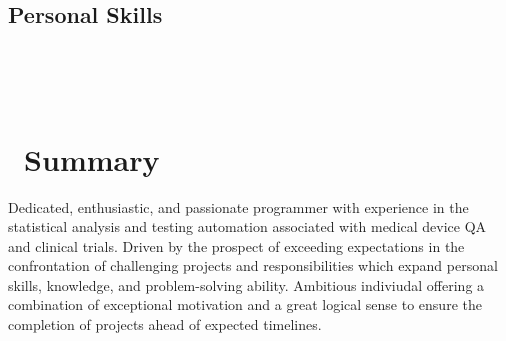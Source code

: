 \documentclass[]{moak-resume}
\begin{document}
\begin{aside}
  \section{Personal Skills}
    ~
\end{aside}
~
\section{ \newline Summary}
\begin{entrylist}
	\entry
	{}
	{}
	{}
	{Dedicated, enthusiastic, and passionate programmer with experience in the statistical analysis and testing automation associated with medical device QA and clinical trials.  Driven by the prospect of exceeding expectations in the confrontation of challenging projects and responsibilities which expand personal skills, knowledge, and problem-solving ability.  Ambitious indiviudal offering a combination of exceptional motivation and a great logical sense to ensure the completion of projects ahead of expected timelines.\\}
\end{entrylist}
\\
\end{document}
